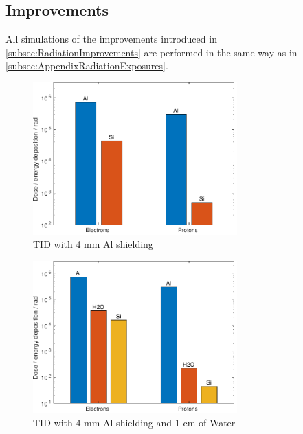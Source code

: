 \newpage

\subsection{Improvements}

\label{subsec:AppendixRadiationImprovements}

All simulations of the improvements introduced in \autoref{subsec:RadiationImprovements} are performed in the same way as in \autoref{subsec:AppendixRadiationExposures}.

\begin{figure}[htp]
	\centering
	\includegraphics[width=0.7\textwidth]{Media/J_Improvements_Individual}
	\caption{TID with 4 mm Al shielding}
	\label{fig:Radiation_Improvements_Individual}
\end{figure}

\begin{figure}[htp]
	\centering
	\includegraphics[width=0.7\textwidth]{Media/J_Improvements_Ice}
	\caption{TID with 4 mm Al shielding and 1 cm of Water}
	\label{fig:Radiation_Improvements_Ice}
\end{figure}

\cleardoublepage